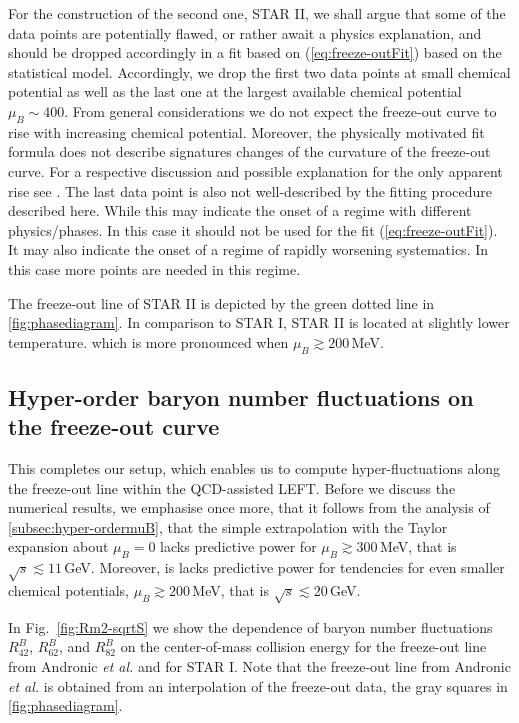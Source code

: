 \documentclass[%
reprint,
superscriptaddress,
showpacs,preprintnumbers,
amsmath,amssymb,
aps,
prd,
]{revtex4-1}
\def\Fig#1{Fig.~\ref{#1}} \def\Tab#1{Tab.~\ref{#1}}
\def\eq#1{(\ref{#1})}
\begin{document}
For the construction of the second one, STAR II, we shall argue that some of the data points are potentially flawed, or rather await a physics explanation, and should be dropped accordingly in a fit based on \eq{eq:freeze-outFit} based on the statistical model. Accordingly, we drop the first two data points at small chemical potential as well as the last one at the largest available chemical potential $\mu_B\sim 400$. From general considerations we do not expect the freeze-out curve to rise with increasing chemical potential. Moreover, the physically motivated fit formula does not describe signatures changes of the curvature of the freeze-out curve. For a respective discussion and possible explanation for the only apparent rise see \cite{Bluhm:2020rha}. The last data point is also not well-described by the fitting procedure described here. While this may indicate the onset of a regime with different physics/phases. In this case it should not be used for the fit \eq{eq:freeze-outFit}. It may also indicate the onset of a regime of rapidly worsening systematics. In this case more points are needed in this regime.   

The freeze-out line of STAR II is depicted by the green dotted line in \autoref{fig:phasediagram}. In comparison to STAR I, STAR II is located at slightly lower temperature. which is more pronounced when $\mu_B\gtrsim 200$\,MeV. 



\subsection{Hyper-order baryon number fluctuations on the  freeze-out curve}
\label{subsec:freezout}	

This completes our setup, which enables us to compute hyper-fluctuations along the freeze-out line within the QCD-assisted LEFT. Before we discuss the numerical results, we emphasise once more, that it follows from the analysis of \autoref{subsec:hyper-ordermuB}, that the simple extrapolation with the Taylor expansion about $\mu_B=0$ lacks predictive power for $\mu_B\gtrsim 300$\,MeV, that is $\sqrt{s}\lesssim 11$\,GeV. Moreover, 
is lacks predictive power for tendencies for even smaller chemical potentials, $\mu_B\gtrsim 200$\,MeV, that is $\sqrt{s}\lesssim 20$\,GeV. 


In \Fig{fig:Rm2-sqrtS} we show the dependence of baryon number fluctuations $R^{B}_{42}$, $R^{B}_{62}$, and $R^{B}_{82}$ on the center-of-mass collision energy for the freeze-out line from Andronic {\it et al.} \cite{Andronic:2017pug} and for STAR I. Note that the freeze-out line from Andronic {\it et al.} is obtained from an interpolation of the freeze-out data, the gray squares in \autoref{fig:phasediagram}. 
\end{document}
